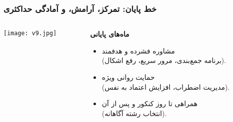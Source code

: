\documentclass[aspectratio=169]{beamer}
\begin{document}
\begin{frame}[fragile]
  \frametitle{خط پایان: تمرکز، آرامش، و آمادگی حداکثری}

  \begin{columns}[T]
    \begin{column}{0.4\textwidth}
      \texttt{[image: v9.jpg]}
    \end{column}

    \begin{column}{0.55\textwidth}
      \begin{flushright}
        \textbf{ماه‌های پایانی}
      \end{flushright}
      \begin{itemize}\setlength{\itemsep}{5pt}\setlength{\parsep}{3pt}
        \item مشاوره فشرده و هدفمند\\(برنامه جمع‌بندی، مرور سریع، رفع اشکال).
        \item حمایت روانی ویژه\\(مدیریت اضطراب، افزایش اعتماد به نفس).
        \item همراهی تا روز کنکور و پس از آن\\(انتخاب رشته آگاهانه).
      \end{itemize}
    \end{column}
  \end{columns}
\end{frame}
\end{document}

